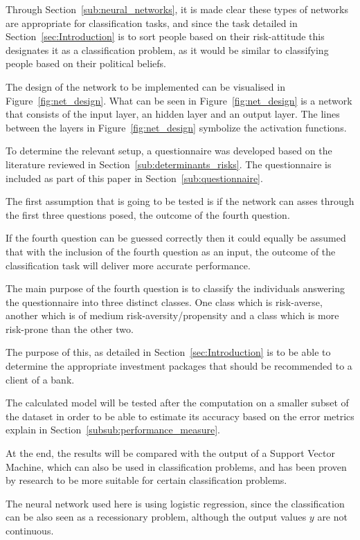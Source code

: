 \documentclass[12pt]{article}
\begin{document}
Through Section~\ref{sub:neural_networks}, it is made clear these types of networks are appropriate for classification tasks, and since the task detailed in Section~\ref{sec:Introduction} is to sort people based on their risk-attitude this designates it as a classification problem, as it would be similar to classifying people based on their political beliefs. 

The design of the network to be implemented can be visualised in Figure~\ref{fig:net_design}. What can be seen in Figure~\ref{fig:net_design} is a network that consists of the input layer, an hidden layer and an output layer. The lines between the layers in Figure~\ref{fig:net_design} symbolize the activation functions.

To determine the relevant setup, a questionnaire was developed based on the literature reviewed in Section~\ref{sub:determinants_risks}. The questionnaire is included as part of this paper in Section~\ref{sub:questionnaire}. 

The first assumption that is going to be tested is if the network can asses through the first three questions posed, the outcome of the fourth question. 

If the fourth question can be guessed correctly then it could equally be assumed that with the inclusion of the fourth question as an input, the outcome of the classification task will deliver more accurate performance.

The main purpose of the fourth question is to classify the individuals answering the questionnaire into three distinct classes. One class which is risk-averse, another which is of medium risk-aversity/propensity and a class which is more risk-prone than the other two. 

The purpose of this, as detailed in Section~\ref{sec:Introduction} is to be able to determine the appropriate investment packages that should be recommended to a client of a bank.

The calculated model will be tested after the computation on a smaller subset of the dataset in order to be able to estimate its accuracy based on the error metrics explain in Section~\ref{subsub:performance_measure}. 

At the end, the results will be compared with the output of a Support Vector Machine, which can also be used in classification problems, and has been proven by research to be more suitable for certain classification problems. 

The neural network used here is using logistic regression, since the classification can be also seen as a recessionary problem, although the output values $y$ are not continuous.
\end{document}
